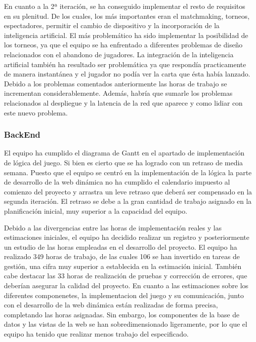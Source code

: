 En cuanto a la 2ª iteración, se ha conseguido implementar el resto de requisitos en su plenitud. De los cuales, los más importantes eran el matchmaking, torneos, espectadores, permitir el cambio de dispositivo y la incorporación de la inteligencia artificial. El más problemático ha sido implementar la posibilidad de los torneos, ya que el equipo se ha enfrentado a diferentes problemas de diseño relacionados con el abandono de jugadores. La integración de la inteligencia artificial también ha resultado ser problemática ya que respondía practicamente de manera instantánea y el jugador no podía ver la carta que ésta había lanzado.
\\
Debido a los problemas comentados anteriormente las horas de trabajo se incrementan considerablemente. Además, habría que sumarle los problemas relacionados al despliegue y la latencia de la red que aparece y como lidiar con este nuevo problema.

\subsubsection*{BackEnd}
El equipo ha cumplido el diagrama de Gantt en el apartado de implementación de lógica del juego. Si bien es cierto que se ha logrado con un retraso de media semana. Puesto que el equipo se centró en la implementación de la lógica la parte de desarrollo de la web dinámica no ha cumplido el calendario impuesto al comienzo del proyecto y arrastra un leve retraso que deberá ser compensado en la segunda iteración. El retraso se debe a la gran cantidad de trabajo asignado en la planificación inicial, muy superior a la capacidad del equipo.

Debido a las divergencias entre las horas de implementación reales y las estimaciones iniciales, el equipo ha decidido realizar un registro y posteriormente un estudio de las horas empleadas en el desarrollo del proyecto. El equipo ha realizado 349 horas de trabajo, de las cuales 106 se han invertido en tareas de gestión, una cifra muy superior a establecida en la estimación inicial. También cabe destacar las 33 horas de realización de pruebas y corrección de errores, que deberían asegurar la calidad del proyecto. En cuanto a las estimaciones sobre los diferentes componenetes, la implementacion del juego y su comunicación, junto con el desarrollo de la web dinámica están realizadas de forma precisa, completando las horas asignadas. Sin embargo, los componentes de la base de datos y las vistas de la web se han sobredimensionado ligeramente, por lo que el equipo ha tenido que realizar menos trabajo del especificado. 

